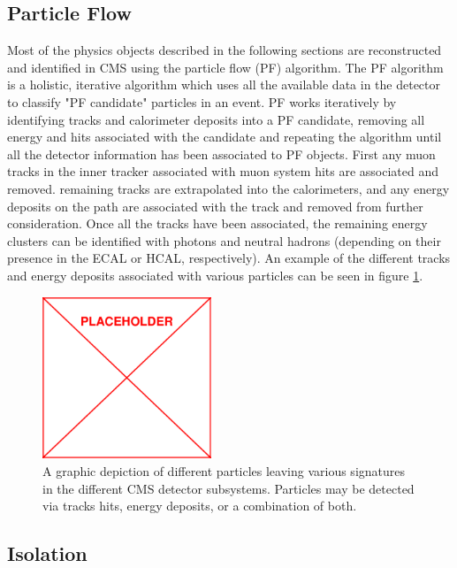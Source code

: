 \subsection{Particle Flow}
\label{subsec:pf}
Most of the physics objects described in the following sections are reconstructed and identified in CMS using the particle flow (PF) algorithm. The PF algorithm is a holistic, iterative algorithm which uses all the available data in the detector to classify "PF candidate" particles in an event. PF works iteratively by identifying tracks and calorimeter deposits into a PF candidate, removing all energy and hits associated with the candidate and repeating the algorithm until all the detector information has been associated to PF objects. First any muon tracks in the inner tracker associated with muon system hits are associated and removed. remaining tracks are extrapolated into the calorimeters, and any energy deposits on the path are associated with the track and removed from further consideration. Once all the tracks have been associated, the remaining energy clusters can be identified with photons and neutral hadrons (depending on their presence in the ECAL or HCAL, respectively). An example of the different tracks and energy deposits associated with various particles can be seen in figure \ref{fig:pfCandidates}.
\begin{figure}
	\centering
	\includegraphics[width=0.45\textwidth]{figs/placeholder}
	\caption{A graphic depiction of different particles leaving various signatures in the different CMS detector subsystems. Particles may be detected via tracks hits, energy deposits, or a combination of both.}
	\label{fig:pfCandidates}
\end{figure}

\subsection{Isolation}
\label{subsec:iso}

